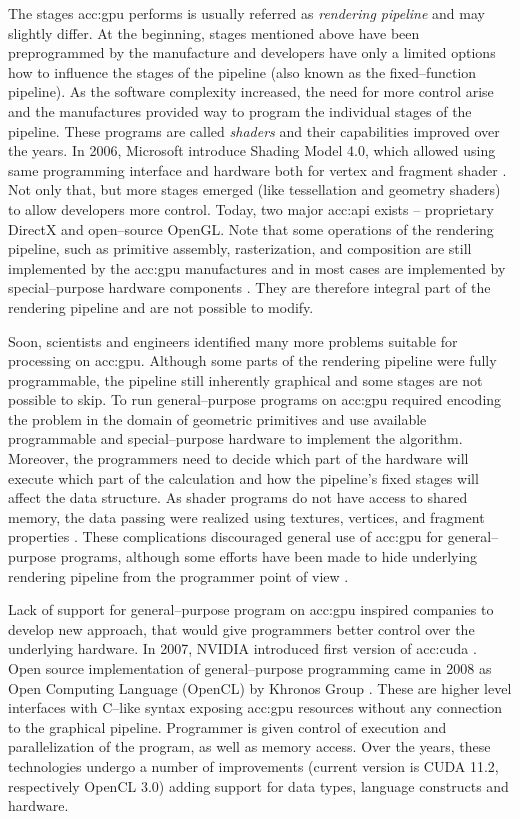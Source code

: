 The stages \acrshort{acc:gpu} performs is usually referred as \emph{rendering pipeline} and may slightly differ. At the beginning, stages mentioned above have been preprogrammed by the manufacture and developers have only a limited options how to influence the stages of the pipeline (also known as the fixed--function pipeline). As the software complexity increased, the need for more control arise and the manufactures provided way to program the individual stages of the pipeline. These programs are called \emph{shaders} and their capabilities improved over the years. In 2006, Microsoft introduce Shading Model 4.0, which allowed using same programming interface and hardware both for vertex and fragment shader \citep{DirectX10}. Not only that, but more stages emerged (like tessellation and geometry shaders) to allow developers more control. Today, two major \acrfull{acc:api} exists -- proprietary  DirectX and open--source OpenGL. Note that some operations of the rendering pipeline, such as primitive assembly, rasterization, and composition are still implemented by the \acrshort{acc:gpu} manufactures and in most cases are implemented by special--purpose hardware components \citep{SoftwareRasterization}. They are therefore integral part of the rendering pipeline and are not possible to modify.

Soon, scientists and engineers identified many more problems suitable for processing on \acrshort{acc:gpu}. Although some parts of the rendering pipeline were fully programmable, the pipeline still inherently graphical and some stages are not possible to skip. To run general--purpose programs on \acrshort{acc:gpu} required encoding the problem in the domain of geometric primitives and use available programmable and special--purpose hardware to implement the algorithm. Moreover, the programmers need to decide which part of the hardware will execute which part of the calculation and how the pipeline's fixed stages will affect the data structure. As shader programs do not have access to shared memory, the data passing were realized using textures, vertices, and fragment properties \citep{GPUComputingOwens}. These complications discouraged general use of \acrshort{acc:gpu} for general--purpose programs, although some efforts have been made to hide underlying rendering pipeline from the programmer point of view \citep{BrookGPU}.

Lack of support for general--purpose program on \acrshort{acc:gpu} inspired companies to develop new approach, that would give programmers better control over the underlying hardware. In 2007, NVIDIA introduced first version of \acrfull{acc:cuda} \citep{CUDAwiki}. Open source implementation of general--purpose programming came in 2008 as Open Computing Language (OpenCL) by Khronos Group \citep{OpenCLRelease}. These are higher level interfaces with C--like syntax exposing \acrshort{acc:gpu} resources without any connection to the graphical pipeline. Programmer is given control of execution and parallelization of the program, as well as memory access. Over the years, these technologies undergo a number of improvements (current version is CUDA 11.2, respectively OpenCL 3.0) adding support for data types, language constructs and hardware.

